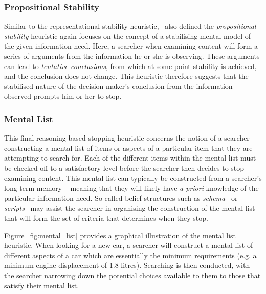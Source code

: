 \subsubsection{Propositional Stability}
Similar to the representational stability heuristic,~\cite{nickles1995judgment} also defined the \emph{propositional stability} heuristic again focuses on the concept of a stabilising mental model of the given information need. Here, a searcher when examining content will form a series of arguments from the information he or she is observing. These arguments can lead to \emph{tentative conclusions}, from which at some point stability is achieved, and the conclusion does not change. This heuristic therefore suggests that the stabilised nature of the decision maker's conclusion from the information observed prompts him or her to stop.

\subsubsection{Mental List}
This final reasoning based stopping heuristic concerns the notion of a searcher constructing a mental list of items or aspects of a particular item that they are attempting to search for. Each of the different items within the mental list must be checked off to a satisfactory level before the searcher then decides to stop examining content. This mental list can typically be constructed from a searcher's long term memory -- meaning that they will likely have \emph{a priori} knowledge of the particular information need. So-called belief structures such as \emph{schema}~\citep{bartlett1933remembering} or \emph{scripts}~\citep{schank1977scripts} may assist the searcher in organising the construction of the mental list that will form the set of criteria that determines when they stop.

Figure~\ref{fig:mental_list} provides a graphical illustration of the mental list heuristic. When looking for a new car, a searcher will construct a mental list of different aspects of a car which are essentially the minimum requirements (e.g. a minimum engine displacement of 1.8 litres). Searching is then conducted, with the searcher narrowing down the potential choices available to them to those that satisfy their mental list.

